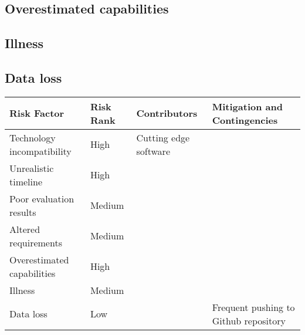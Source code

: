 \subsection*{Overestimated capabilities}


\subsection*{Illness}


\subsection*{Data loss}




\begin{center}
    \begin{tabular}{ | l | l | l | p{5cm} |}
    \hline
    Risk Factor & Risk Rank & Contributors & Mitigation and Contingencies \\ \hline
    Technology incompatibility & High & Cutting edge software & \\ \hline 
    Unrealistic timeline & High & & \\ \hline
    Poor evaluation results & Medium & & \\ \hline
    Altered requirements & Medium & & \\ \hline
    Overestimated capabilities & High & & \\ \hline
    Illness & Medium & & \\ \hline 
    Data loss & Low &  & Frequent pushing to Github repository\\ \hline 

   
    \hline
    \end{tabular}
\end{center}





